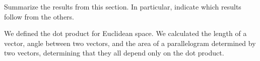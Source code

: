 \documentclass{ximera}
\begin{document}
\begin{problem}
Summarize the results from this section. In particular, indicate which
results follow from the others.
\begin{freeResponse}
We defined the dot product for Euclidean space. We calculated the length of a vector, angle between two vectors, and the area of a parallelogram determined by two vectors, determining that they all depend only on the dot product. 
\end{freeResponse}
\end{problem}
\end{document}
